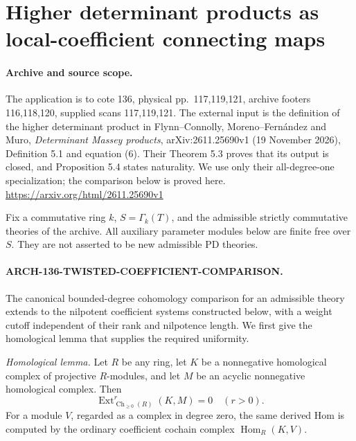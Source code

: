 \section{Higher determinant products as local-coefficient connecting maps}
\label{sec:136determinant}

\paragraph{Archive and source scope.}
The application is to cote 136, physical pp.~117,119,121, archive
footers 116,118,120, supplied scans 117,119,121.
The external input is the definition of the higher determinant product
in Flynn--Connolly, Moreno--Fernández and Muro,
\emph{Determinant Massey products}, arXiv:2611.25690v1
(19 November 2026), Definition 5.1 and equation (6).
Their Theorem 5.3 proves that its output is closed, and Proposition 5.4
states naturality. We use only their all-degree-one specialization;
the comparison below is proved here.
\url{https://arxiv.org/html/2611.25690v1}

Fix a commutative ring \(k\), \(S=\Gamma_k(T)\), and the admissible
strictly commutative theories of the archive. All auxiliary parameter
modules below are finite free over \(S\). They are not asserted to be
new admissible PD theories.

\paragraph{ARCH-136-TWISTED-COEFFICIENT-COMPARISON.}
The canonical bounded-degree cohomology comparison for an admissible
theory extends to the nilpotent coefficient systems constructed below,
with a weight cutoff independent of their rank and nilpotence length.
We first give the homological lemma that supplies the required uniformity.

\emph{Homological lemma.}
Let \(R\) be any ring, let \(K\) be a nonnegative homological complex of
projective \(R\)-modules, and let \(M\) be an acyclic nonnegative
homological complex. Then
\[
 \operatorname{Ext}^r_{\operatorname{Ch}_{\geq0}(R)}(K,M)=0
                         \quad(r>0).                 \tag{136.DC1}
\]
For a module \(V\), regarded as a complex in degree zero, the same
derived Hom is computed by the ordinary coefficient cochain complex
\(\operatorname{Hom}_R(K,V)\).

